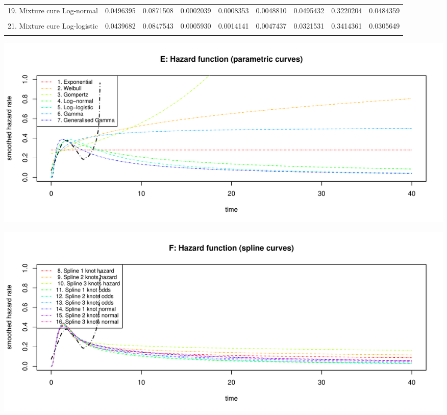 \documentclass[]{article}
\begin{document}
\begin{table}
{\begin{tabular}[t]{lrrrrrrrr}
19. Mixture cure Log-normal & 0.0496395 & 0.0871508 & 0.0002039 & 0.0008353 & 0.0048810 & 0.0495432 & 0.3220204 & 0.0484359\\
\cellcolor{gray!6}{20. Non-mixture cure Log-normal} & \cellcolor{gray!6}{0.0514956} & \cellcolor{gray!6}{0.0842490} & \cellcolor{gray!6}{0.0012590} & \cellcolor{gray!6}{0.0032428} & \cellcolor{gray!6}{0.0107457} & \cellcolor{gray!6}{0.0537620} & \cellcolor{gray!6}{0.3323853} & \cellcolor{gray!6}{0.0503940}\\
21. Mixture cure Log-logistic & 0.0439682 & 0.0847543 & 0.0005930 & 0.0014141 & 0.0047437 & 0.0321531 & 0.3414361 & 0.0305649\\
\cellcolor{gray!6}{22. Non-mixture cure Log-logistic} & \cellcolor{gray!6}{0.0410716} & \cellcolor{gray!6}{0.0836704} & \cellcolor{gray!6}{0.0004619} & \cellcolor{gray!6}{0.0010900} & \cellcolor{gray!6}{0.0036280} & \cellcolor{gray!6}{0.0253772} & \cellcolor{gray!6}{0.3434417} & \cellcolor{gray!6}{0.0241440}\\
\bottomrule
\end{tabular}}
\end{table}

\begin{flushleft}\includegraphics[height=0.29\textheight]{Images/validate_extrapolation3-5} \end{flushleft}

\begin{flushleft}\includegraphics[height=0.29\textheight]{Images/validate_extrapolation3-6} \end{flushleft}
\end{document}
